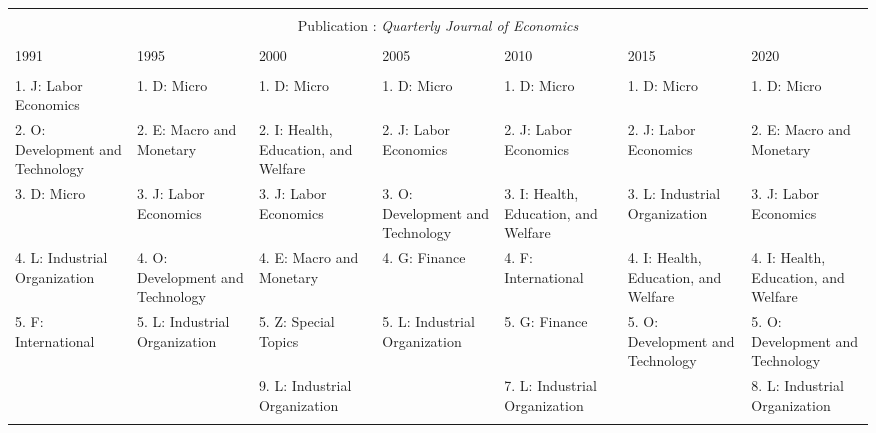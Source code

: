 
\begin{table}[h] \centering 
  \caption{} 
  \label{} 
\begin{adjustbox}{max width = \textwidth}
\scriptsize 
\begin{tabular}{@{\extracolsep{5pt}} lllllll} 
\\[-1.8ex]\hline 
\hline \\[-1.8ex] \multicolumn{7}{c}{Publication : \textit{Quarterly Journal of Economics}} \\
 \cline{1-7} \\
1991 & 1995 & 2000 & 2005 & 2010 & 2015 & 2020 \\ 
\hline \\[-1.8ex] 
1. J: Labor Economics & 1. D: Micro & 1. D: Micro & 1. D: Micro & 1. D: Micro & 1. D: Micro & 1. D: Micro \\ 
2. O: Development and Technology & 2. E: Macro and Monetary & 2. I: Health, Education, and Welfare & 2. J: Labor Economics & 2. J: Labor Economics & 2. J: Labor Economics & 2. E: Macro and Monetary \\ 
3. D: Micro & 3. J: Labor Economics & 3. J: Labor Economics & 3. O: Development and Technology & 3. I: Health, Education, and Welfare & 3. L: Industrial Organization & 3. J: Labor Economics \\ 
4. L: Industrial Organization & 4. O: Development and Technology & 4. E: Macro and Monetary & 4. G: Finance & 4. F: International & 4. I: Health, Education, and Welfare & 4. I: Health, Education, and Welfare \\ 
5. F: International & 5. L: Industrial Organization & 5. Z: Special Topics & 5. L: Industrial Organization & 5. G: Finance & 5. O: Development and Technology & 5. O: Development and Technology \\ 
 &  & 9. L: Industrial Organization &  & 7. L: Industrial Organization &  & 8. L: Industrial Organization \\ 
\hline \\[-1.8ex] 
\end{tabular} 
\end{adjustbox} 
\end{table} 
